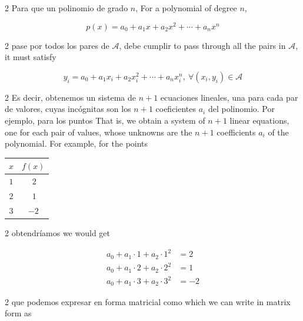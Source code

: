 \begin{paracol}{2}
Para que un polinomio de grado $n$,
\switchcolumn
For a polynomial of degree $n$,
\end{paracol}
\begin{equation*}
p(x)=a_0+a_1x+a_2x^2+\cdots+a_nx^n
\end{equation*}
\begin{paracol}{2}
pase por todos los pares de $\mathcal{A}$, debe cumplir
\switchcolumn
to pass through all the pairs in $\mathcal{A}$, it must satisfy
\end{paracol}
\begin{equation*}
y_i=a_0+a_1x_i+a_2x_i^2+\cdots+a_nx_i^n, \ \forall (x_i,y_i) \in \mathcal{A}
\end{equation*}
\begin{paracol}{2}
Es decir, obtenemos un sistema de $n+1$ ecuaciones lineales, una para cada par de valores, cuyas incógnitas son los $n+1$ coeficientes $a_i$ del polinomio. Por ejemplo, para los puntos
\switchcolumn
That is, we obtain a system of $n+1$ linear equations, one for each pair of values, whose unknowns are the $n+1$ coefficients $a_i$ of the polynomial. For example, for the points
\end{paracol}
\begin{table}[h]
\centering
\begin{tabular}{c|c}
$x$&$f(x)$\\
\hline
$1$&$\ 2$\\
$2$&$ \ 1$\\
$3$&$-2$
\end{tabular}
\label{tpuntos4}
\end{table}
\begin{paracol}{2}
obtendríamos
\switchcolumn
we would get
\end{paracol}
\begin{align*}
a_0+a_1\cdot 1+ a_2\cdot 1^2&=2\\
a_0+a_1\cdot 2+ a_2\cdot 2^2&=1\\
a_0+a_1\cdot 3+ a_2\cdot 3^2&=-2
\end{align*}
\begin{paracol}{2}
que podemos expresar en forma matricial como
\switchcolumn
which we can write in matrix form as
\end{paracol}

